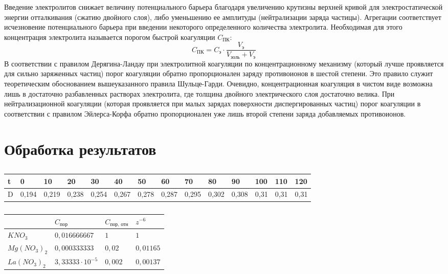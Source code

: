 \documentclass[a4paper, 12pt]{article}
\begin{document}
Введение электролитов снижает величину
потенциального барьера благодаря увеличению крутизны верхней кривой для
электростатической энергии отталкивания (сжатию двойного слоя), либо уменьшению ее
амплитуды (нейтрализации заряда частицы). Агрегации соответствует исчезновение
потенциального барьера при введении некоторого определенного количества электролита.
Необходимая для этого концентрация электролита называется порогом быстрой
коагуляции $C_{\text{ПК}}$:
\[C_\text{ПК}=C_\text{э}\cdot \frac{V_\text{э}}{V_\text{золь}+V_\text{э}}\]
В соответствии с правилом Дерягина-Ландау при электролитной коагуляции по
концентрационному механизму (который лучше проявляется для сильно заряженных
частиц) порог коагуляции обратно пропорционален заряду противоионов в шестой
степени. Это правило служит теоретическим обоснованием вышеуказанного правила
Шульце-Гарди. Очевидно, концентрационная коагуляция в чистом виде возможна лишь в
достаточно разбавленных растворах электролита, где толщина двойного электрического
слоя достаточно велика.
При нейтрализационной коагуляции (которая проявляется при малых зарядах
поверхности диспергированных частиц) порог коагуляции в соответствии с правилом
Эйлерса-Корфа обратно пропорционален уже лишь второй степени заряда добавляемых
противоионов.



\newpage
\section{Обработка результатов}

\begin{table}[h]
	\centering
	\caption{}
	\label{my-label}
	\begin{tabular}{|l|l|l|l|l|l|l|l|l|l|l|l|l|l|}
\hline
t  & 0     & 10    & 20    & 30    & 40    & 50    & 60    & 70    & 80    & 90    & 100  & 110  & 120  \\ \hline
D & 0,194 & 0,219 & 0,238 & 0,254 & 0,267 & 0,278 & 0,287 & 0,295 & 0,302 & 0,308 & 0,31 & 0,31 & 0,31 \\ \hline
	\end{tabular}
\end{table}

\begin{table}[h]
	\centering
	\caption{}
	\begin{tabular}{|l|l|l|l|}
		\hline
		  &$C_\text{пор} $ & $C_\text{пор, отн} $ & $z^{-6}$ \\ 
		\hline
		$KNO_3$ & $0,016666667$ & $1$ & $1$ \\
		\hline
		$Mg(NO_3)_2$ & $0,000333333$ & $0,02$ &$0,01165$ \\
		\hline
		$La(NO_3)_2$ &$3,33333\cdot 10^{-5}$
 &$0,002$ & $0,00137$ \\
		\hline
	
	\end{tabular}
\end{table}
\end{document}
